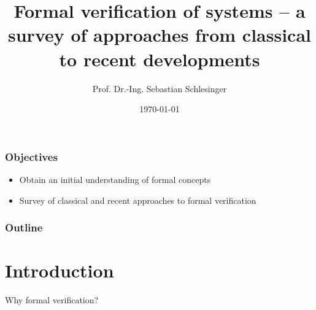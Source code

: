 \documentclass{beamer}
\title[Formal Verification]{Formal verification of systems -- a survey of approaches from classical to recent developments}
\author[Sebastian Schlesinger]{Prof. Dr.-Ing. Sebastian Schlesinger}
\institute[HWR Berlin]{Berlin School for Economics and Law}
\date{\today}
\begin{document}
 \begin{frame}
\titlepage
\end{frame}
\begin{frame}
\frametitle{Objectives}
\begin{itemize}
\item Obtain an initial understanding of formal concepts
\item Survey of classical and recent approaches to formal verification
 
\end{itemize}

\end{frame}
\begin{frame}
  \frametitle{Outline}
  \tableofcontents
\end{frame}

\section{Introduction}
\begin{frame}{Why formal verification?}
  
\end{frame}
  
\end{document}
